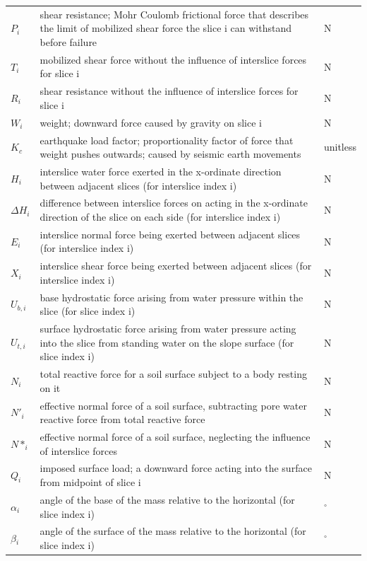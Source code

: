 \documentclass[12pt]{article}
\begin{document}
\begin{longtable*}{l l l}
\\
$P_{i}$ & shear resistance; Mohr Coulomb frictional force that describes the limit of mobilized shear force the slice i can withstand before failure & N
\\
$T_{i}$ & mobilized shear force without the influence of interslice forces for slice i & N
\\
$R_{i}$ & shear resistance without the influence of interslice forces for slice i & N
\\
$W_{i}$ & weight; downward force caused by gravity on slice i & N
\\
$K_{c}$ & earthquake load factor; proportionality factor of force that weight pushes outwards; caused by seismic earth movements & unitless
\\
$H_{i}$ & interslice water force exerted in the x-ordinate direction between adjacent slices (for interslice index i) & N
\\
$\Delta{}H_{i}$ & difference between interslice forces on acting in the x-ordinate direction of the slice on each side (for interslice index i) & N
\\
$E_{i}$ & interslice normal force being exerted between adjacent slices (for interslice index i) & N
\\
$X_{i}$ & interslice shear force being exerted between adjacent slices (for interslice index i) & N
\\
$U_{b,i}$ & base hydrostatic force arising from water pressure within the slice (for slice index i) & N
\\
$U_{t,i}$ & surface hydrostatic force arising from water pressure acting into the slice from standing water on the slope surface (for slice index i) & N
\\
$N_{i}$ & total reactive force for a soil surface subject to a body resting on it & N
\\
$N'_{i}$ & effective normal force of a soil surface, subtracting pore water reactive force from total reactive force & N
\\
$N*_{i}$ & effective normal force of a soil surface, neglecting the influence of interslice forces & N
\\
$Q_{i}$ & imposed surface load; a downward force acting into the surface from midpoint of slice i & N
\\
$\alpha{}_{i}$ & angle of the base of the mass relative to the horizontal (for slice index i) & ${}^{\circ}$
\\
$\beta{}_{i}$ & angle of the surface of the mass relative to the horizontal (for slice index i) & ${}^{\circ}$

\end{longtable*}
\end{document}
